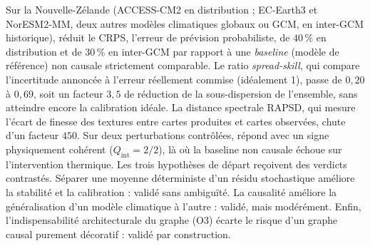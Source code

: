 \label{concl:analyse}

Sur la Nouvelle-Zélande (ACCESS-CM2 en distribution ; EC-Earth3 et NorESM2-MM, deux autres modèles climatiques globaux ou GCM, en inter-GCM historique), \Oracle{} réduit le CRPS, l'erreur de prévision probabiliste, de $40\,\%$ en distribution et de $30\,\%$ en inter-GCM par rapport à une \emph{baseline} (modèle de référence) non causale strictement comparable. Le ratio \emph{spread-skill}, qui compare l'incertitude annoncée à l'erreur réellement commise (idéalement 1), passe de $0{,}20$ à $0{,}69$, soit un facteur $3{,}5$ de réduction de la sous-dispersion de l'ensemble, sans atteindre encore la calibration idéale. La distance spectrale RAPSD, qui mesure l'écart de finesse des textures entre cartes produites et cartes observées, chute d'un facteur $450$. Sur deux perturbations contrôlées, \Oracle{} répond avec un signe physiquement cohérent ($Q_{\mathrm{int}}=2/2$), là où la baseline non causale échoue sur l'intervention thermique. Les trois hypothèses de départ reçoivent des verdicts contrastés. Séparer une moyenne déterministe d'un résidu stochastique améliore la stabilité et la calibration : validé sans ambiguïté. La causalité améliore la généralisation d'un modèle climatique à l'autre : validé, mais modérément. Enfin, l'indispensabilité architecturale du graphe (O3) écarte le risque d'un graphe causal purement décoratif : validé par construction.

